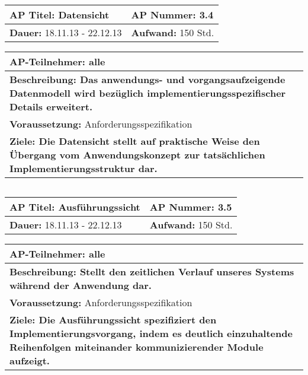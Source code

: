 \begin{tabular}{|p{7.43cm}|p{7.43cm}|}
\hline
\textbf{AP Titel: }Datensicht & \textbf{AP Nummer: }3.4\\ 
\hline
\textbf{Dauer: }18.11.13 - 22.12.13& \textbf{Aufwand: }150 Std.\\
\hline
\end{tabular}
\begin{tabular}{|p{15.3cm}|}
\hline
\textbf{AP-Teilnehmer: }alle\\
\hline
\textbf{Beschreibung: Das anwendungs- und vorgangsaufzeigende Datenmodell wird bezüglich implementierungsspezifischer Details erweitert. }\\
\hline
\textbf{Voraussetzung: }Anforderungsspezifikation\\
\hline 
\textbf{Ziele: Die Datensicht stellt auf praktische Weise den Übergang vom Anwendungskonzept zur tatsächlichen Implementierungsstruktur dar.}\\
\hline 
\end{tabular}
\begin{verbatim}

\end{verbatim}

\begin{tabular}{|p{7.43cm}|p{7.43cm}|}
\hline
\textbf{AP Titel: }Ausführungssicht & \textbf{AP Nummer: }3.5\\ 
\hline
\textbf{Dauer: }18.11.13 - 22.12.13& \textbf{Aufwand: }150 Std.\\
\hline
\end{tabular}
\begin{tabular}{|p{15.3cm}|}
\hline
\textbf{AP-Teilnehmer: }alle\\
\hline
\textbf{Beschreibung: Stellt den zeitlichen Verlauf unseres Systems während der Anwendung dar.}\\
\hline
\textbf{Voraussetzung: }Anforderungsspezifikation\\
\hline 
\textbf{Ziele: Die Ausführungssicht spezifiziert den Implementierungsvorgang, indem es deutlich einzuhaltende Reihenfolgen miteinander kommunizierender Module aufzeigt.}\\
\hline 
\end{tabular}
\begin{verbatim}

\end{verbatim}

